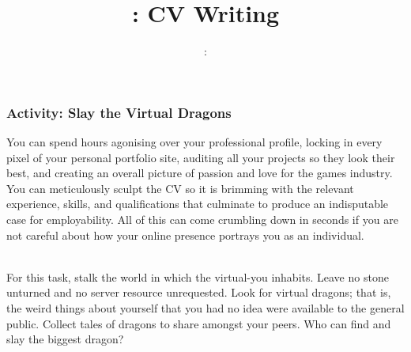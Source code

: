 \usepackage{../../beamerthemeFalmouthGamesAcademy}
\usepackage{multimedia}
\usepackage{soul}
\usepackage{tikz}
\usepackage{enumitem}
\usepackage{verbatim}
\graphicspath{ {../../} }


\usepackage[normalem]{ulem}
\usepackage{wasysym}

\usepackage{pdfpages}

\usetikzlibrary{arrows,automata}



\def\signed #1{{\leavevmode\unskip\nobreak\hfil\penalty50\hskip2em
  \hbox{}\nobreak\hfil(#1)%
  \parfillskip=0pt \finalhyphendemerits=0 \endgraf}}

\newsavebox\mybox
\newenvironment{aquote}[1]
  {\savebox\mybox{#1}\begin{quote}}
  {\signed{\usebox\mybox}\end{quote}}



\title{\sessionnumber: \normalsize{CV Writing}}
\subtitle{\modulecode: \moduletitle}

\frame{\titlepage} 
\begin{frame}
	\frametitle{Activity: Slay the Virtual Dragons}
	\small{
	You can spend hours agonising over your professional profile, locking in every pixel of your personal portfolio site, auditing all your projects so they look their best, and creating an overall picture of passion and love for the games industry. You can meticulously sculpt the CV so it is brimming with the relevant experience, skills, and qualifications that culminate to produce an indisputable case for employability. All of this can come crumbling down in seconds if you are not careful about how your online presence portrays you as an individual.  \\~\\
	}

\small{
For this task, stalk the world in which the virtual-you inhabits. Leave no stone unturned and no server resource unrequested. Look for virtual dragons; that is, the weird things about yourself that you had no idea were available to the general public. Collect tales of dragons to share amongst your peers. Who can find and slay the biggest dragon? }
\end{frame}	
	
